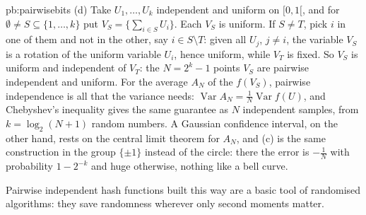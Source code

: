 \begin{solution}{pb:pairwisebits}
(d) Take $U_1,\dots,U_k$ independent and uniform on $[0,1[$, and for $\emptyset\ne S\subseteq\{1,\dots,k\}$ put $V_S=\bigl\{\sum_{i\in S}U_i\bigr\}$. Each $V_S$ is uniform.
If $S\ne T$, pick $i$ in one of them and not in the other, say $i\in S\setminus T$: given all $U_j$, $j\ne i$, the variable $V_S$ is a rotation of the uniform variable
$U_i$, hence uniform, while $V_T$ is fixed. So $V_S$ is uniform and independent of $V_T$: the $N=2^k-1$ points $V_S$ are pairwise independent and uniform. For the average
$A_N$ of the $f(V_S)$, pairwise independence is all that the variance needs: $\operatorname{Var}A_N=\frac1N\operatorname{Var}f(U)$, and Chebyshev's inequality gives the
same guarantee as $N$ independent samples, from $k=\log_2(N+1)$ random numbers. A Gaussian confidence interval, on the other hand, rests on the central limit theorem
for $A_N$, and (c) is the same construction in the group $\{\pm1\}$ instead of the circle: there the error is $-\frac1N$ with probability $1-2^{-k}$ and huge otherwise,
nothing like a bell curve.

\leads Pairwise independent hash functions built this way are a basic tool of randomised algorithms: they save randomness wherever only second moments
matter.
\end{solution}

